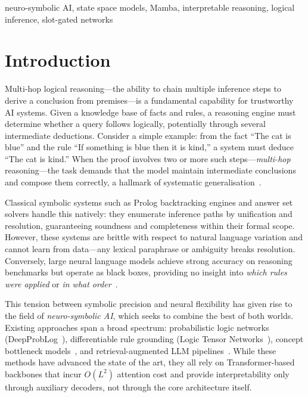 \documentclass[conference]{IEEEtran}
\begin{document}
\begin{IEEEkeywords}
neuro-symbolic AI, state space models, Mamba, interpretable
reasoning, logical inference, slot-gated networks
\end{IEEEkeywords}

\section{Introduction}
\label{sec:intro}

Multi-hop logical reasoning---the ability to chain multiple
inference steps to derive a conclusion from premises---is a
fundamental capability for trustworthy AI systems.  Given a
knowledge base of facts and rules, a reasoning engine must
determine whether a query follows logically, potentially through
several intermediate deductions.  Consider a simple example: from
the fact ``The cat is blue'' and the rule ``If something is blue
then it is kind,'' a system must deduce ``The cat is kind.''
When the proof involves two or more such steps---\emph{multi-hop}
reasoning---the task demands that the model maintain intermediate
conclusions and compose them correctly, a hallmark of systematic
generalisation~\cite{clark2020ruletaker}.

Classical symbolic systems such as Prolog backtracking engines and
answer set solvers handle this natively: they enumerate inference
paths by unification and resolution, guaranteeing soundness and
completeness within their formal scope.  However, these systems
are brittle with respect to natural language variation and cannot
learn from data---any lexical paraphrase or ambiguity breaks
resolution.  Conversely, large neural language models achieve
strong accuracy on reasoning benchmarks but operate as black
boxes, providing no insight into \emph{which rules were applied}
or \emph{in what order}~\cite{tafjord2021proofwriter}.

This tension between symbolic precision and neural flexibility
has given rise to the field of \emph{neuro-symbolic AI}, which
seeks to combine the best of both worlds.  Existing approaches
span a broad spectrum: probabilistic logic networks
(DeepProbLog~\cite{manhaeve2018deepproblog}), differentiable rule
grounding (Logic Tensor Networks~\cite{badreddine2022ltn}),
concept bottleneck models~\cite{koh2020cbm}, and retrieval-augmented
LLM pipelines~\cite{kazemi2023lambada}.  While these methods have
advanced the state of the art, they all rely on Transformer-based
backbones that incur $O(L^2)$ attention cost and provide
interpretability only through auxiliary decoders, not through the
core architecture itself.
\end{document}
